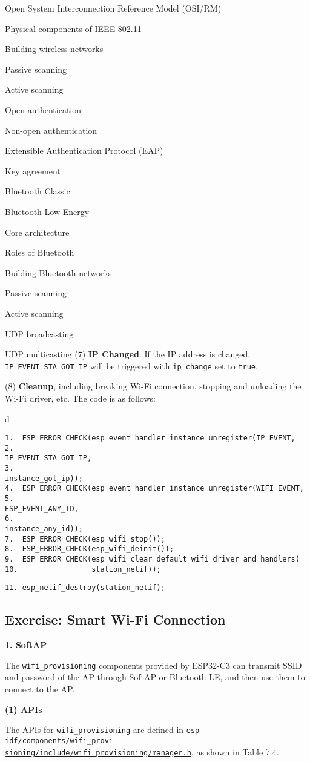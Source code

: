 \documentclass[a4paper,12pt]{book}
\begin{document}
\begin{term}{Open System Interconnection Reference Model (OSI/RM)}
\begin{term}{Physical components of IEEE 802.11}
\begin{term}{Building wireless networks}
\begin{term}{Passive scanning}
\begin{term}{Active scanning}
\begin{term}{Open authentication}
\begin{term}{Non-open authentication}
\begin{term}{Extensible Authentication Protocol (EAP)}
\begin{term}{Key agreement}
\begin{term}{Bluetooth Classic}
\begin{term}{Bluetooth Low Energy}
\begin{term}{Core architecture}
\begin{term}{Roles of Bluetooth}
\begin{term}{Building Bluetooth networks}
\begin{term}{Passive scanning}
\begin{term}{Active scanning}
\begin{term}{UDP broadcasting}
\begin{term}{UDP multicasting}
(7) \textbf{IP Changed}. If the IP address is changed, \verb|IP_EVENT_STA_GOT_IP| will be triggered with \verb|ip_change| set to \verb|true|.

(8) \textbf{Cleanup}, including breaking Wi-Fi connection, stopping and unloading the Wi-Fi driver, etc. The code is as follows:


\begin{tabular}{d}
\vspace{2pt}
\begin{verbatim}
1.  ESP_ERROR_CHECK(esp_event_handler_instance_unregister(IP_EVENT,
2.                                                        IP_EVENT_STA_GOT_IP,
3.                                                        instance_got_ip));
4.  ESP_ERROR_CHECK(esp_event_handler_instance_unregister(WIFI_EVENT,
5.                                                        ESP_EVENT_ANY_ID,
6.                                                        instance_any_id));
7.  ESP_ERROR_CHECK(esp_wifi_stop());
8.  ESP_ERROR_CHECK(esp_wifi_deinit());
9.  ESP_ERROR_CHECK(esp_wifi_clear_default_wifi_driver_and_handlers(
10.                 station_netif));
\end{verbatim}
\verb|11. esp_netif_destroy(station_netif);|
\end{tabular}


\subsection{Exercise: Smart Wi-Fi Connection}
\textbf{1. SoftAP}

The \verb|wifi_provisioning| components provided by ESP32-C3 can transmit SSID and password of the AP through SoftAP or Bluetooth LE, and then use them to connect to the AP.

\textbf{(1) APIs}

The APIs for \verb|wifi_provisioning| are defined in \href{https://github.com/espressif/esp-idf/blob/master/components/wifi_provisioning/include/wifi_provisioning/manager.h}{\texttt{esp-idf/components/wifi\_provi\\ sioning/include/wifi\_provisioning/manager.h}}, as shown in Table 7.4.


\end{term}
\end{term}
\end{term}
\end{term}
\end{term}
\end{term}
\end{term}
\end{term}
\end{term}
\end{term}
\end{term}
\end{term}
\end{term}
\end{term}
\end{term}
\end{term}
\end{term}
\end{term}
\end{document}
